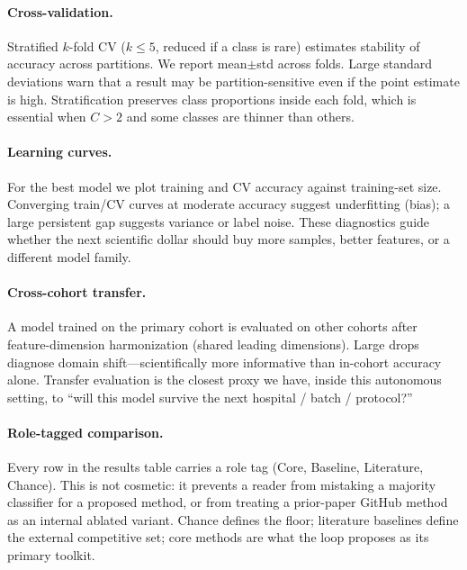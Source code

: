 \documentclass[10pt,journal]{IEEEtran}
\begin{document}
\paragraph{Cross-validation.}
Stratified $k$-fold CV ($k\le 5$, reduced if a class is rare) estimates stability of accuracy
across partitions. We report mean$\pm$std across folds. Large standard deviations warn that a
result may be partition-sensitive even if the point estimate is high. Stratification preserves
class proportions inside each fold, which is essential when $C>2$ and some classes are thinner
than others.

\paragraph{Learning curves.}
For the best model we plot training and CV accuracy against training-set size. Converging
train/CV curves at moderate accuracy suggest underfitting (bias); a large persistent gap
suggests variance or label noise. These diagnostics guide whether the next scientific dollar
should buy more samples, better features, or a different model family.

\paragraph{Cross-cohort transfer.}
A model trained on the primary cohort is evaluated on other cohorts after feature-dimension
harmonization (shared leading dimensions). Large drops diagnose domain shift---scientifically
more informative than in-cohort accuracy alone. Transfer evaluation is the closest proxy we
have, inside this autonomous setting, to ``will this model survive the next hospital / batch /
protocol?''

\paragraph{Role-tagged comparison.}
Every row in the results table carries a role tag (Core, Baseline, Literature, Chance). This
is not cosmetic: it prevents a reader from mistaking a majority classifier for a proposed
method, or from treating a prior-paper GitHub method as an internal ablated variant. Chance
defines the floor; literature baselines define the external competitive set; core methods are
what the loop proposes as its primary toolkit.
\end{document}
